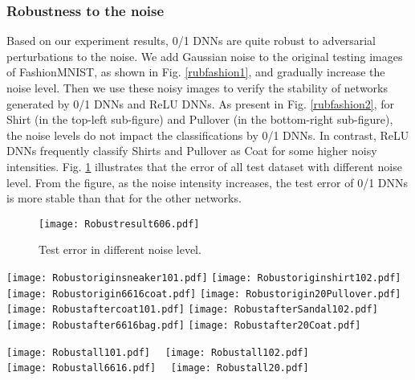 \documentclass[journal]{IEEEtran}
\begin{document}
 \subsubsection{Robustness to the noise} Based on our experiment results,  0/1 DNNs are quite robust to adversarial perturbations to the noise. We add Gaussian noise to the original testing images of FashionMNIST, as shown in Fig.  \ref{rubfashion1}, and gradually increase the noise level. Then we use these noisy images to verify the stability of networks generated by 0/1 DNNs and ReLU DNNs. As present in Fig. \ref{rubfashion2}, for Shirt (in the top-left sub-figure) and Pullover (in the bottom-right sub-figure),  the noise levels do not impact the classifications by 0/1 DNNs. In contrast, ReLU DNNs frequently classify Shirts and Pullover as Coat for some higher noisy intensities.  Fig. \ref{fig:Robust} illustrates that the error of all test dataset with different noise level. From the figure, as the noise intensity increases, the test error of  0/1 DNNs is more stable than that for the other networks.

\begin{figure}[H]
\centering
\texttt{[image: Robustresult606.pdf]}\vspace{-2mm}
\caption{Test error in different noise level.}
\label{fig:Robust}
\end{figure}

\begin{figure*}[!th]
\centering
\texttt{[image: Robustoriginsneaker101.pdf]}
\texttt{[image: Robustoriginshirt102.pdf]}
\texttt{[image: Robustorigin6616coat.pdf]}
\texttt{[image: Robustorigin20Pullover.pdf]}\\
\texttt{[image: Robustaftercoat101.pdf]}
\texttt{[image: RobustafterSandal102.pdf]}
\texttt{[image: Robustafter6616bag.pdf]}
\texttt{[image: Robustafter20Coat.pdf]}
\caption{Images in FashionMNIST. The first and second rows show  the original and noisy images.  }
\label{rubfashion1}
\end{figure*}


\begin{figure*}[!th]
\centering
\texttt{[image: Robustall101.pdf]}~~
\texttt{[image: Robustall102.pdf]}\\
\texttt{[image: Robustall6616.pdf]}~~
\texttt{[image: Robustall20.pdf]}\vspace{-5mm}
\caption{Robustness to the noise.}
\label{rubfashion2}
\end{figure*}
\end{document}
